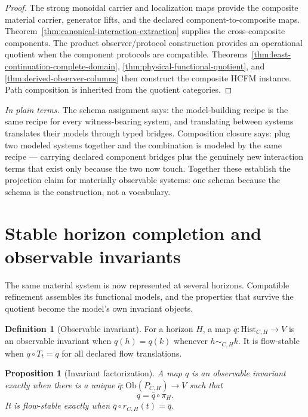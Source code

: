 \documentclass[11pt]{article}
\newtheorem{proposition}{Proposition}
\theoremstyle{definition}
\newtheorem{definition}{Definition}
\newcommand{\plainterms}{\emph{In plain terms.}}
\begin{document}
\begin{proof}
The strong monoidal carrier and localization maps provide the composite
material carrier, generator lifts, and the declared component-to-composite
maps. Theorem~\ref{thm:canonical-interaction-extraction} supplies the
cross-composite components. The product observer/protocol construction
provides an operational quotient when the component protocols are compatible.
Theorems~\ref{thm:least-continuation-complete-domain},
\ref{thm:physical-functional-quotient}, and
\ref{thm:derived-observer-columns} then construct the composite HCFM
instance. Path composition is inherited from the quotient categories.
\end{proof}

\noindent\plainterms{} The schema assignment says: the model-building recipe is the same recipe for every witness-bearing system, and translating between systems translates their models through typed bridges. Composition closure says: plug two modeled systems together and the combination is modeled by the same recipe --- carrying declared component bridges plus the genuinely new interaction terms that exist only because the two now touch. Together these establish the projection claim for materially observable systems: one schema because the schema is the construction, not a vocabulary.

\section{Stable horizon completion and observable invariants}

The same material system is now represented at several horizons. Compatible refinement assembles its functional models, and the properties that survive the quotient become the model's own invariant objects.

\begin{definition}[Observable invariant]
For a horizon $H$, a map $q : \mathrm{Hist}_{C,H} \to V$ is an observable invariant when $q(h) = q(k)$ whenever $h \sim_{C,H} k$. It is flow-stable when $q \circ T_t = q$ for all declared flow translations.
\end{definition}

\begin{proposition}[Invariant factorization]
A map $q$ is an observable invariant exactly when there is a unique $\bar{q} : \mathrm{Ob}(P_{C,H}) \to V$ such that
\begin{equation}
q = \bar{q} \circ \pi_H. \tag{S11}
\end{equation}
It is flow-stable exactly when $\bar{q} \circ r_{C,H}(t) = \bar{q}$.
\end{proposition}
\end{document}
